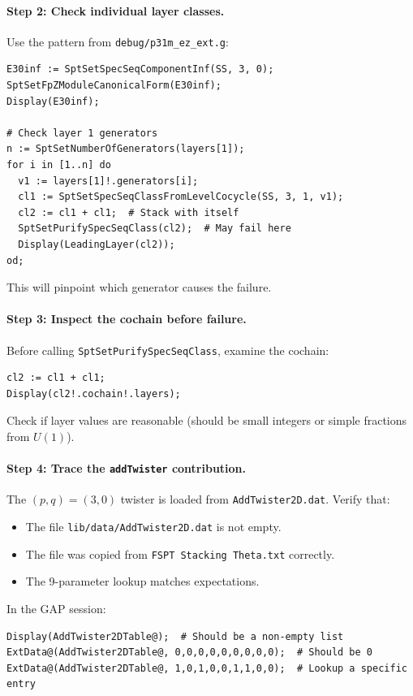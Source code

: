 \documentclass{SciPost}
\begin{document}
\paragraph{Step 2: Check individual layer classes.}
Use the pattern from \texttt{debug/p31m\_ez\_ext.g}:
\begin{verbatim}
E30inf := SptSetSpecSeqComponentInf(SS, 3, 0);
SptSetFpZModuleCanonicalForm(E30inf);
Display(E30inf);

# Check layer 1 generators
n := SptSetNumberOfGenerators(layers[1]);
for i in [1..n] do
  v1 := layers[1]!.generators[i];
  cl1 := SptSetSpecSeqClassFromLevelCocycle(SS, 3, 1, v1);
  cl2 := cl1 + cl1;  # Stack with itself
  SptSetPurifySpecSeqClass(cl2);  # May fail here
  Display(LeadingLayer(cl2));
od;
\end{verbatim}
This will pinpoint which generator causes the failure.

\paragraph{Step 3: Inspect the cochain before failure.}
Before calling \texttt{SptSetPurifySpecSeqClass}, examine the cochain:
\begin{verbatim}
cl2 := cl1 + cl1;
Display(cl2!.cochain!.layers);
\end{verbatim}
Check if layer values are reasonable (should be small integers or simple fractions from $U(1)$).

\paragraph{Step 4: Trace the \texttt{addTwister} contribution.}
The $(p,q)=(3,0)$ twister is loaded from \texttt{AddTwister2D.dat}.
Verify that:
\begin{itemize}
    \item The file \texttt{lib/data/AddTwister2D.dat} is not empty.
    \item The file was copied from \texttt{FSPT Stacking Theta.txt} correctly.
    \item The 9-parameter lookup matches expectations.
\end{itemize}
In the GAP session:
\begin{verbatim}
Display(AddTwister2DTable@);  # Should be a non-empty list
ExtData@(AddTwister2DTable@, 0,0,0,0,0,0,0,0,0);  # Should be 0
ExtData@(AddTwister2DTable@, 1,0,1,0,0,1,1,0,0);  # Lookup a specific entry
\end{verbatim}
\end{document}
